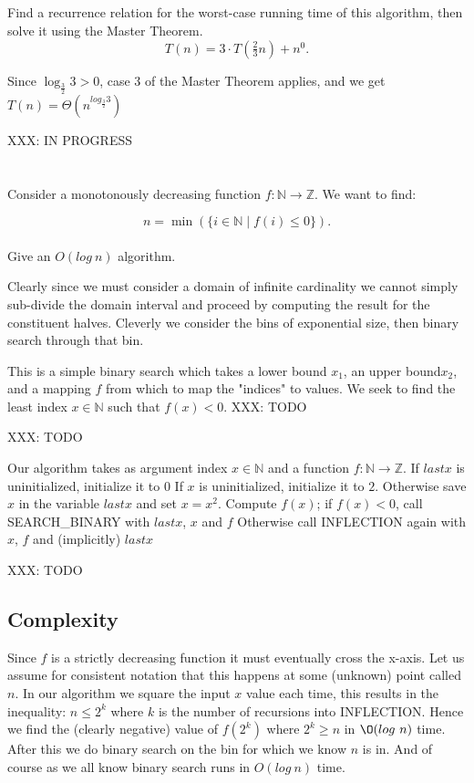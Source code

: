 \documentclass{amsart}
\theoremstyle{definition}
\theoremstyle{remark}
\numberwithin{equation}{section}
\newcommand{\NN}{\mathbb N}
\newcommand{\ZZ}{\mathbb Z}
\begin{document}
\subsection{} Find a recurrence relation for the worst-case running time of this algorithm, then solve it using the Master Theorem.
$$ T(n) = 3 \cdot T( \tfrac{2}{3} n) + n^0. $$

Since $\log_{\frac{3}{2}} {3} > 0$, case 3 of the Master Theorem applies, and we get
$T(n) = \Theta ( n^{log_{\frac{3}{2}} {3}} )$

XXX: IN PROGRESS
\section{} Consider a monotonously decreasing function $f : \NN \rightarrow \ZZ$. We want to find:

$$ n = \min (\{i \in \NN \mid f(i) \leq 0 \}).$$ \\ 

Give an $O(log\ n)$ algorithm.

Clearly since we must consider a domain of infinite cardinality we cannot simply sub-divide the domain interval and proceed by computing the result for the constituent halves. Cleverly we consider the bins of exponential size, then binary search through that bin.


This is a simple binary search which takes a lower bound $x_1$, an upper bound$x_2$,
and a mapping $f$ from which to map the "indices" to values. We seek to find
the least index $x \in \NN$ such that $f(x) < 0$.
XXX: TODO

\proof
XXX: TODO


Our algorithm takes as argument index $x \in \NN$ and a function $f :
\NN \rightarrow \ZZ$. If $lastx$ is uninitialized, initialize it to $0$
If $x$ is uninitialized, initialize it to $2$. Otherwise save $x$ in the
variable $lastx$ and set $x = x^2$. Compute $f(x)$; if $f(x) < 0$, call
SEARCH\_BINARY with $lastx$, $x$ and $f$ Otherwise call INFLECTION again with
$x$, $f$ and (implicitly) $lastx$

\proof
XXX: TODO


\subsection{Complexity}

Since $f$ is a strictly decreasing function it must eventually cross the
x-axis. Let us assume for consistent notation that this happens at some
(unknown) point called $n$. In our algorithm we square the input $x$
value each time, this results in the inequality: $n \leq 2^k$ where $k$
is the number of recursions into INFLECTION. Hence we find the (clearly
negative) value of $f(2^k)$ where $2^k \geq n$ in $\O(log\ n)$ time. After this
we do binary search on the bin for which we know $n$ is in. And of course
as we all know binary search runs in $O( log\ n )$ time.
\end{document}
